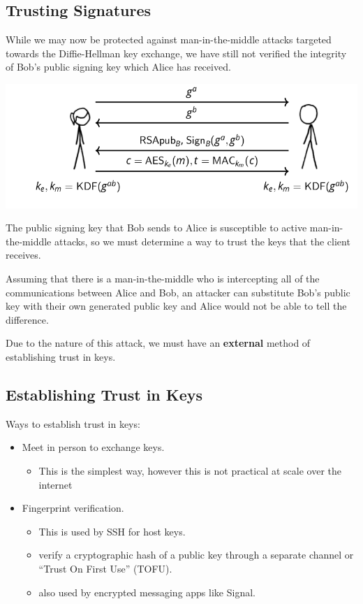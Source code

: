 \documentclass[11pt]{article} %
\begin{document}
\newpage
\subsection{Trusting Signatures}
While we may now be protected against man-in-the-middle attacks targeted towards
the Diffie-Hellman key exchange, we have still not verified the integrity of
Bob's public signing key which Alice has received.

\includegraphics[scale=.7]{./tls4.png}

The public signing key that Bob sends to Alice is susceptible to
active man-in-the-middle attacks, so we must determine a way to trust the keys 
that the client receives.

\bigskip
Assuming that there is a man-in-the-middle who is intercepting all of the
communications between Alice and Bob, an attacker can substitute Bob's public
key with their own generated public key and Alice would not be able to tell 
the difference.

\bigskip
Due to the nature of this attack, we must have an \textbf{external} method of
establishing trust in keys.

\newpage
\subsection{Establishing Trust in Keys}
Ways to establish trust in keys:
\begin{itemize}
  \item Meet in person to exchange keys.
  \begin{itemize}\item This is the simplest way, however this is not practical at scale over the internet
  \end{itemize}
\end{itemize}



\begin{itemize}
  \item Fingerprint verification.
  \begin{itemize}\item This is used by SSH for host keys.  \item verify a cryptographic hash of a public key through a separate channel or “Trust On First Use” (TOFU). 


  \item also used by encrypted messaging apps like Signal.


  \end{itemize}
\end{itemize}
\end{document}
